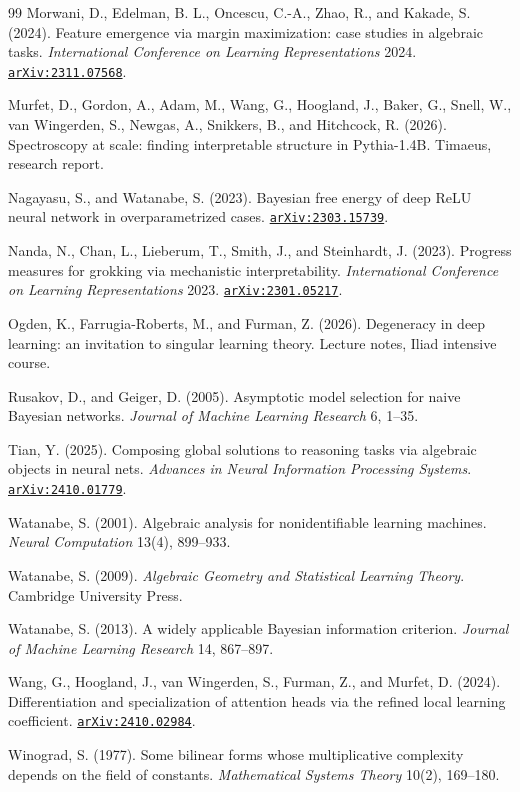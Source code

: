 \documentclass[11pt]{amsart}
\newcommand{\arxiv}[1]{\href{https://arxiv.org/abs/#1}{\texttt{arXiv:#1}}}
\theoremstyle{plain}
\theoremstyle{definition}
\begin{document}
\begin{thebibliography}{99}
Morwani, D., Edelman, B. L., Oncescu, C.-A., Zhao, R., and Kakade, S. (2024). Feature emergence via margin maximization: case studies in algebraic tasks. \emph{International Conference on Learning Representations} 2024. \arxiv{2311.07568}.

Murfet, D., Gordon, A., Adam, M., Wang, G., Hoogland, J., Baker, G., Snell, W., van Wingerden, S., Newgas, A., Snikkers, B., and Hitchcock, R. (2026). Spectroscopy at scale: finding interpretable structure in Pythia-1.4B. Timaeus, research report.

Nagayasu, S., and Watanabe, S. (2023). Bayesian free energy of deep ReLU neural network in overparametrized cases. \arxiv{2303.15739}.

Nanda, N., Chan, L., Lieberum, T., Smith, J., and Steinhardt, J. (2023). Progress measures for grokking via mechanistic interpretability. \emph{International Conference on Learning Representations} 2023. \arxiv{2301.05217}.

Ogden, K., Farrugia-Roberts, M., and Furman, Z. (2026). Degeneracy in deep learning: an invitation to singular learning theory. Lecture notes, Iliad intensive course.

Rusakov, D., and Geiger, D. (2005). Asymptotic model selection for naive Bayesian networks. \emph{Journal of Machine Learning Research} 6, 1--35.

Tian, Y. (2025). Composing global solutions to reasoning tasks via algebraic objects in neural nets. \emph{Advances in Neural Information Processing Systems}. \arxiv{2410.01779}.

Watanabe, S. (2001). Algebraic analysis for nonidentifiable learning machines. \emph{Neural Computation} 13(4), 899--933.

Watanabe, S. (2009). \emph{Algebraic Geometry and Statistical Learning Theory}. Cambridge University Press.

Watanabe, S. (2013). A widely applicable Bayesian information criterion. \emph{Journal of Machine Learning Research} 14, 867--897.

Wang, G., Hoogland, J., van Wingerden, S., Furman, Z., and Murfet, D. (2024). Differentiation and specialization of attention heads via the refined local learning coefficient. \arxiv{2410.02984}.

Winograd, S. (1977). Some bilinear forms whose multiplicative complexity depends on the field of constants. \emph{Mathematical Systems Theory} 10(2), 169--180.


\end{thebibliography}
\end{document}
